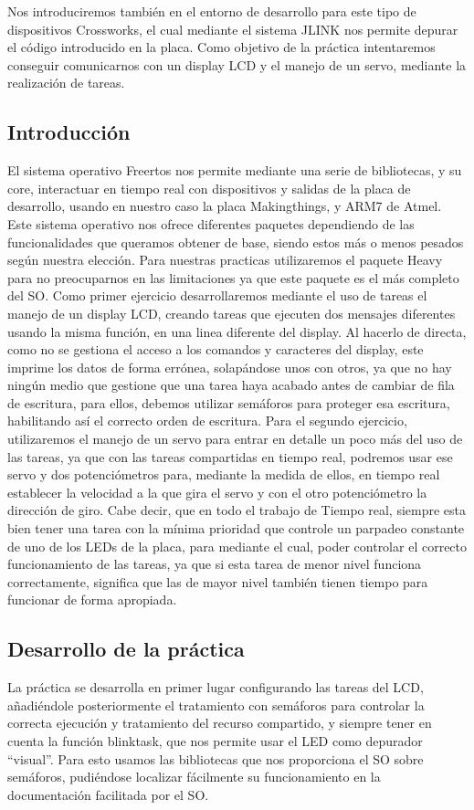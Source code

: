 \documentclass[a4paper, 11pt]{article}
\begin{document}
Nos introduciremos también en el entorno de desarrollo para este
tipo de dispositivos Crossworks, el cual mediante el sistema JLINK
nos permite depurar el código introducido en la placa.  Como
objetivo de la práctica intentaremos conseguir comunicarnos con un
display LCD y el manejo de un servo, mediante la realización de
tareas.

\subsection{Introducción}
El sistema operativo Freertos nos permite mediante una serie de
bibliotecas, y su core, interactuar en tiempo real con
dispositivos y salidas de la placa de desarrollo, usando en
nuestro caso la placa Makingthings, y ARM7 de Atmel.  Este
sistema operativo nos ofrece diferentes paquetes dependiendo de
las funcionalidades que queramos obtener de base, siendo estos
más o menos pesados según nuestra elección.  Para nuestras
practicas utilizaremos el paquete Heavy para no preocuparnos en
las limitaciones ya que este paquete es el más completo del SO.
Como primer ejercicio desarrollaremos mediante el uso de tareas
el manejo de un display LCD, creando tareas que ejecuten dos
mensajes diferentes usando la misma función, en una linea
diferente del display. Al hacerlo de directa, como no se gestiona
el acceso a los comandos y caracteres del display, este imprime
los datos de forma errónea, solapándose unos con otros, ya que no
hay ningún medio que gestione que una tarea haya acabado antes de
cambiar de fila de escritura, para ellos, debemos utilizar
semáforos para proteger esa escritura, habilitando así el
correcto orden de escritura.  Para el segundo ejercicio,
utilizaremos el manejo de un servo para entrar en detalle un poco
más del uso de las tareas, ya que con las tareas compartidas en
tiempo real, podremos usar ese servo y dos potenciómetros para,
mediante la medida de ellos, en tiempo real establecer la
velocidad a la que gira el servo y con el otro potenciómetro la
dirección de giro.  Cabe decir, que en todo el trabajo de Tiempo
real, siempre esta bien tener una tarea con la mínima prioridad
que controle un parpadeo constante de uno de los LEDs de la
placa, para mediante el cual, poder controlar el correcto
funcionamiento de las tareas, ya que si esta tarea de menor nivel
funciona correctamente, significa que las de mayor nivel también
tienen tiempo para funcionar de forma apropiada.

\subsection{Desarrollo de la práctica}
La práctica se desarrolla en primer lugar configurando las tareas
del LCD, añadiéndole posteriormente el tratamiento con semáforos
para controlar la correcta ejecución y tratamiento del recurso
compartido, y siempre tener en cuenta la función blinktask, que
nos permite usar el LED como depurador ``visual''. Para esto
usamos las bibliotecas que nos proporciona el SO sobre semáforos,
pudiéndose localizar fácilmente su funcionamiento en la
documentación facilitada por el SO.
\inputminted[tabsize=4, fontsize=\small]{c}{prac7-makedisplay.c}
\end{document}
